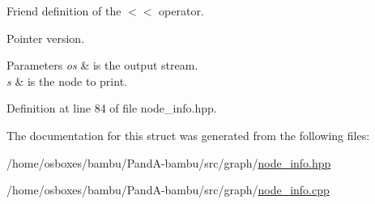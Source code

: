 Friend definition of the $<$$<$ operator. 

Pointer version. 
\begin{DoxyParams}{Parameters}
{\em os} & is the output stream. \\
\hline
{\em s} & is the node to print. \\
\hline
\end{DoxyParams}


Definition at line 84 of file node\+\_\+info.\+hpp.



The documentation for this struct was generated from the following files\+:\begin{DoxyCompactItemize}
\item 
/home/osboxes/bambu/\+Pand\+A-\/bambu/src/graph/\hyperlink{node__info_8hpp}{node\+\_\+info.\+hpp}\item 
/home/osboxes/bambu/\+Pand\+A-\/bambu/src/graph/\hyperlink{node__info_8cpp}{node\+\_\+info.\+cpp}\end{DoxyCompactItemize}
